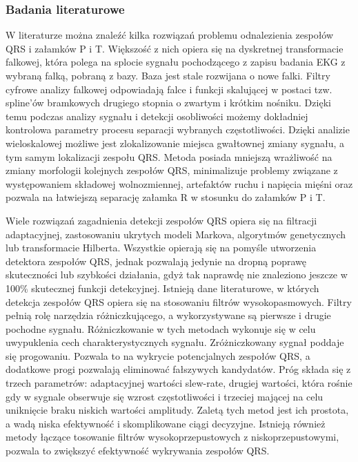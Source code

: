 \documentclass[a4paper, 11pt]{article}
\begin{document}
\subsubsection{Badania literaturowe}
\label{sec:st_interval:papers}
W literaturze można znaleźć kilka rozwiązań problemu odnalezienia zespołów QRS i załamków P i T. Większość z nich opiera się na dyskretnej transformacie falkowej, która polega na splocie
sygnału pochodzącego z zapisu badania EKG z wybraną falką, pobraną z bazy. Baza jest stale rozwijana o nowe falki. Filtry cyfrowe analizy falkowej odpowiadają falce i funkcji skalującej w postaci tzw.
spline’ów bramkowych drugiego stopnia o zwartym i krótkim nośniku. Dzięki temu
podczas analizy sygnału i detekcji osobliwości możemy dokładniej kontrolowa parametry
procesu separacji wybranych częstotliwości. Dzięki analizie wieloskalowej możliwe jest
zlokalizowanie miejsca gwałtownej zmiany sygnału, a tym samym lokalizacji zespołu QRS.
Metoda posiada mniejszą wrażliwość na zmiany morfologii kolejnych zespołów QRS,
minimalizuje problemy związane z występowaniem składowej wolnozmiennej, artefaktów
ruchu i napięcia mięśni oraz pozwala na łatwiejszą separację załamka R w stosunku do
załamków P i T.

Wiele rozwiązań zagadnienia detekcji zespołów QRS opiera się na filtracji adaptacyjnej,
zastosowaniu ukrytych modeli Markova, algorytmów genetycznych lub
transformacie Hilberta. Wszystkie opierają się na pomyśle utworzenia detektora zespołów QRS, jednak pozwalają jedynie na dropną poprawę
skuteczności lub szybkości działania, gdyż tak naprawdę nie znaleziono jeszcze w 100\% skutecznej funkcji detekcyjnej. 
Istnieją dane literaturowe, w których detekcja zespołów QRS opiera się na stosowaniu filtrów wysokopasmowych. Filtry pełnią rolę narzędzia różniczkującego, a wykorzystywane są pierwsze i drugie pochodne sygnału. Różniczkowanie w tych metodach wykonuje się w celu uwypuklenia cech charakterystycznych sygnału. Zróżniczkowany sygnał poddaje się progowaniu. Pozwala to na wykrycie potencjalnych zespołów QRS, a dodatkowe progi pozwalają eliminować fałszywych kandydatów. Próg składa się z trzech parametrów: adaptacyjnej wartości slew-rate, drugiej wartości, która rośnie gdy w sygnale obserwuje się wzrost częstotliwości i trzeciej mającej na celu uniknięcie braku niskich wartości amplitudy. Zaletą tych metod jest ich prostota, a wadą niska efektywność i skomplikowane ciągi decyzyjne. Istnieją również metody łączące tosowanie filtrów wysokoprzepustowych z niskoprzepustowymi, pozwala to zwiększyć efektywność wykrywania zespołów QRS.
\end{document}

